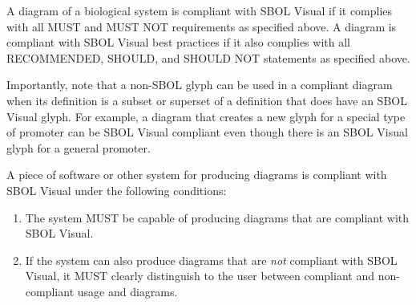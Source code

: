 A diagram of a biological system is compliant with SBOL Visual if it complies with all MUST and MUST NOT requirements as specified above.
A diagram is compliant with SBOL Visual best practices if it also complies with all RECOMMENDED, SHOULD, and SHOULD NOT statements as specified above.

Importantly, note that a non-SBOL glyph can be used in a compliant
diagram when its definition is a subset or superset of a definition that
does have an SBOL Visual glyph.  For example, a diagram that creates a
new glyph for a special type of promoter can be SBOL Visual compliant
even though there is an SBOL Visual glyph for a general promoter.

A piece of software or other system for producing diagrams is
compliant with SBOL Visual under the following conditions:
\begin{enumerate}
\item The system MUST be capable of producing diagrams that are
  compliant with SBOL Visual.
\item If the system can also produce diagrams that are {\em not}
  compliant with SBOL Visual, it MUST clearly distinguish to the user
  between compliant and non-compliant usage and diagrams.
\end{enumerate}

